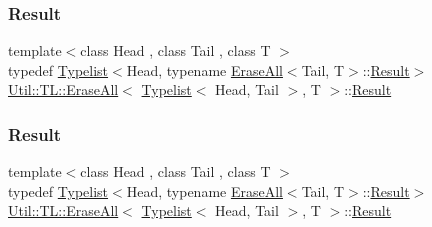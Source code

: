 \subsubsection{\texorpdfstring{Result}{Result}\hspace{0.1cm}{\footnotesize\ttfamily [1/3]}}
{\footnotesize\ttfamily template$<$class Head , class Tail , class T $>$ \\
typedef \mbox{\hyperlink{structUtil_1_1Typelist}{Typelist}}$<$Head, typename \mbox{\hyperlink{structUtil_1_1TL_1_1EraseAll}{Erase\+All}}$<$Tail, T$>$\+::\mbox{\hyperlink{structUtil_1_1TL_1_1EraseAll_3_01Typelist_3_01Head_00_01Tail_01_4_00_01T_01_4_aa724903cc91ed9eea3da277857c8f5aa}{Result}}$>$ \mbox{\hyperlink{structUtil_1_1TL_1_1EraseAll}{Util\+::\+T\+L\+::\+Erase\+All}}$<$ \mbox{\hyperlink{structUtil_1_1Typelist}{Typelist}}$<$ Head, Tail $>$, T $>$\+::\mbox{\hyperlink{structUtil_1_1TL_1_1EraseAll_3_01Typelist_3_01Head_00_01Tail_01_4_00_01T_01_4_aa724903cc91ed9eea3da277857c8f5aa}{Result}}}

\mbox{\label{structUtil_1_1TL_1_1EraseAll_3_01Typelist_3_01Head_00_01Tail_01_4_00_01T_01_4_aa724903cc91ed9eea3da277857c8f5aa}} 
\subsubsection{\texorpdfstring{Result}{Result}\hspace{0.1cm}{\footnotesize\ttfamily [2/3]}}
{\footnotesize\ttfamily template$<$class Head , class Tail , class T $>$ \\
typedef \mbox{\hyperlink{structUtil_1_1Typelist}{Typelist}}$<$Head, typename \mbox{\hyperlink{structUtil_1_1TL_1_1EraseAll}{Erase\+All}}$<$Tail, T$>$\+::\mbox{\hyperlink{structUtil_1_1TL_1_1EraseAll_3_01Typelist_3_01Head_00_01Tail_01_4_00_01T_01_4_aa724903cc91ed9eea3da277857c8f5aa}{Result}}$>$ \mbox{\hyperlink{structUtil_1_1TL_1_1EraseAll}{Util\+::\+T\+L\+::\+Erase\+All}}$<$ \mbox{\hyperlink{structUtil_1_1Typelist}{Typelist}}$<$ Head, Tail $>$, T $>$\+::\mbox{\hyperlink{structUtil_1_1TL_1_1EraseAll_3_01Typelist_3_01Head_00_01Tail_01_4_00_01T_01_4_aa724903cc91ed9eea3da277857c8f5aa}{Result}}}

